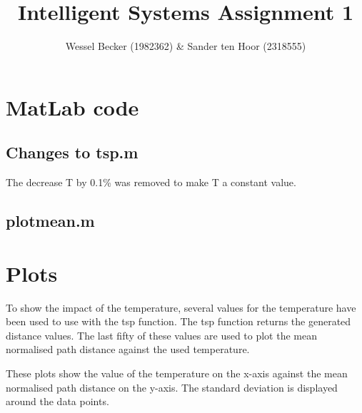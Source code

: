 \documentclass[10pt,a4paper]{article}
\begin{document}
\title{Intelligent Systems Assignment 1}
\author{Wessel Becker (1982362) \& Sander ten Hoor (2318555)}
\maketitle
\section{MatLab code}
\subsection{Changes to tsp.m}
The decrease T by 0.1\% was removed to make T a constant value.


\subsection{plotmean.m}


\section{Plots}
To show the impact of the temperature, several values for the temperature have been used to use with the tsp function. The tsp function returns the generated distance values. The last fifty of these values are used to plot the mean normalised path distance against the used temperature.

These plots show the value of the temperature on the x-axis against the mean normalised path distance on the y-axis. The standard deviation is displayed around the data points. \\

 \\
\end{document}
